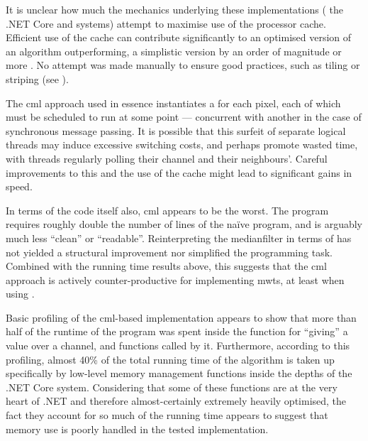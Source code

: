 It is unclear how much the mechanics underlying these implementations (\ie{} the .NET Core and \hopac{} systems) attempt to maximise use of the processor cache.  Efficient use of the cache can contribute significantly to an optimised version of an algorithm outperforming, a simplistic version by an order of magnitude or more \cite{Ragan-Kelley2017}.  No attempt was made manually to ensure good practices, such as tiling or striping (see \eg{} \cite{Midkiff2012}).

The \gls{cml} approach used in essence instantiates a  for each pixel, each of which must be scheduled to run at some point --- concurrent with another  in the case of synchronous message passing.  It is possible that this surfeit of separate logical threads may induce excessive switching costs, and perhaps promote wasted time, with threads regularly polling their channel and their neighbours'.  Careful improvements to this and the use of the cache might lead to significant gains in speed.

In terms of the code itself also, \gls{cml} appears to be the worst.  The program requires roughly double the number of lines of the naïve program, and is arguably much less ``clean'' or ``readable''.  Reinterpreting the \gls{medianfilter} in terms of  has not yielded a structural improvement nor simplified the programming task.  Combined with the running time results above, this suggests that the \gls{cml} approach is actively counter-productive for implementing \glspl{mwt}, at least when using \hopac{}.


Basic profiling of the \gls{cml}-based implementation appears to show that more than half of the runtime of the program was spent inside the function for ``giving'' a value over a channel, and functions called by it.  Furthermore, according to this profiling, almost 40\% of the total running time of the algorithm is taken up specifically by low-level memory management functions inside the depths of the .NET Core system.  Considering that some of these functions are at the very heart of .NET and therefore almost-certainly extremely heavily optimised, the fact they account for so much of the running time appears to suggest that memory use is poorly handled in the tested implementation.

